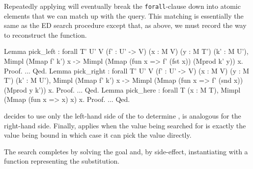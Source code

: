 \documentclass[preprint]{sigplanconf}
\newcommand{\ltac}[0]{\ensuremath{\mathcal{L}_{\mathrm{tac}}}}
\begin{document}
Repeatedly applying  will eventually break the {\tt forall}-clause down into atomic elements that we can match up with the query.
This matching is essentially the same as the ED search procedure except that, as above, we must record the way to reconstruct the  function.
\begin{coq}
Lemma pick_left
: forall {T' U' V} (f' : U' -> V) (x : M V) (y : M T') (k' : M U'),
  Mimpl (Mmap f' k') x ->
  Mimpl (Mmap (fun x => f' (fst x)) (Mprod k' y)) x.
Proof. ... Qed.
Lemma pick_right
: forall {T' U' V} (f' : U' -> V) (x : M V) (y : M T') (k' : M U'),
  Mimpl (Mmap f' k') x ->
  Mimpl (Mmap (fun x => f' (snd x)) (Mprod y k')) x.
Proof. ... Qed.
Lemma pick_here
: forall {T} (x : M T), Mimpl (Mmap (fun x => x) x) x.
Proof. ... Qed.
\end{coq}
 decides to use only the left-hand side of the  to determine ,  is analogous for the right-hand side.
Finally,  applies when the value being searched for is exactly the value being bound in which case it can pick the value directly.


The search completes by solving the goal and, by side-effect, instantiating  with a function representing the substitution.
\end{document}
